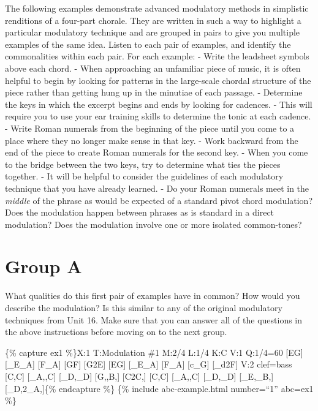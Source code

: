 \documentclass{book}
\begin{document}
The following examples demonstrate advanced modulatory methods in simplistic
renditions of a four-part chorale. They are written in such a way to highlight
a particular modulatory technique and are grouped in pairs to give you
multiple examples of the same idea. Listen to each pair of examples, and
identify the commonalities within each pair. For each example: - Write the
leadsheet symbols above each chord. - When approaching an unfamiliar piece of
music, it is often helpful to begin by looking for patterns in the large-scale
chordal structure of the piece rather than getting hung up in the minutiae of
each passage. - Determine the keys in which the excerpt begins and ends by
looking for cadences. - This will require you to use your ear training skills
to determine the tonic at each cadence. - Write Roman numerals from the
beginning of the piece until you come to a place where they no longer make
sense in that key. - Work backward from the end of the piece to create Roman
numerals for the second key. - When you come to the bridge between the two
keys, try to determine what ties the pieces together. - It will be helpful to
consider the guidelines of each modulatory technique that you have already
learned. - Do your Roman numerals meet in the \emph{middle} of the phrase as
would be expected of a standard pivot chord modulation? Does the modulation
happen between phrases as is standard in a direct modulation? Does the
modulation involve one or more isolated common-tones?

\hypertarget{group-a}{%
\section{Group A}\label{group-a}}

What qualities do this first pair of examples have in common? How would you
describe the modulation? Is this similar to any of the original modulatory
techniques from Unit 16. Make sure that you can answer all of the questions in
the above instructions before moving on to the next group.

\{\% capture ex1 \%\}X:1 T:Modulation \#1 M:2/4 L:1/4 K:C V:1 Q:1/4=60
{[}EG{]} {[}\_E\_A{]}\textbar{} {[}F\_A{]} {[}GF{]}\textbar{}
{[}G2E{]}\textbar{} {[}EG{]} {[}\_E\_A{]}\textbar{} {[}F\_A{]}
{[}c\_G{]}\textbar{} {[}\_d2F{]}\textbar{]} V:2 clef=bass {[}C,C{]}
{[}\_A,,C{]}\textbar{} {[}\_D,\_D{]} {[}G,,B,{]}\textbar{}
{[}C2C,{]}\textbar{} {[}C,C{]} {[}\_A,,C{]}\textbar{} {[}\_D,\_D{]}
{[}\_E,\_B,{]}\textbar{} {[}\_D,2\_A,{]}\textbar{]}\{\% endcapture \%\} \{\%
include abc-example.html number=``1'' abc=ex1 \%\}
\end{document}
